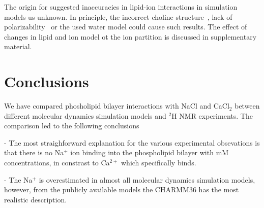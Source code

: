 \documentclass[pre,aps,floatfix,authordate1-4,twocolumn]{revtex4-1}
\begin{document}
The origin for suggested inaccuracies in lipid-ion interactions in simulation models us unknown. 
In principle, the incorrect choline structure~\cite{botan15}, lack of polarizability~\cite{leontyev11} or
the used water model could cause such results. The effect of changes in lipid and ion model ot the ion
partition is discussed in supplementary material.



\section{Conclusions}
We have compared phosholipid bilayer interactions with NaCl and CaCl$_2$ between different molecular dynamics simulation
models and $^2$H NMR experiments. The comparison led to the following conclusions

- The most straighforward explanation for the various experimental obsevations is that there is no Na$^+$ ion binding
into the phospholipid bilayer with mM concentrations, in constrast to Ca$^{2+}$ which specifically binds.

- The Na$^+$ is overestimated in almost all molecular dynamics simulation models, however, from the publicly available
models the CHARMM36 has the most realistic description.
\end{document}
